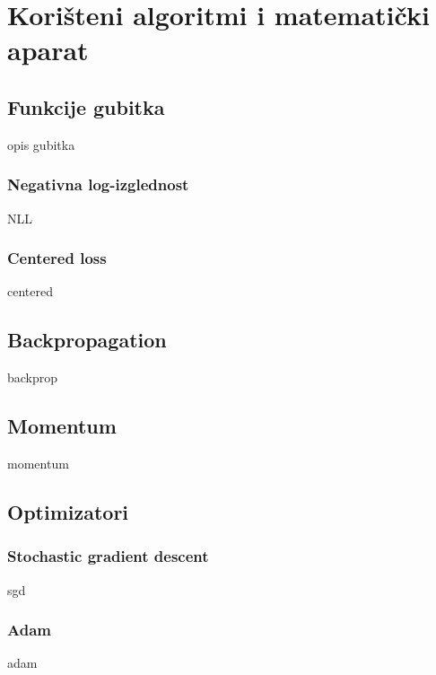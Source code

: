 \chapter{Korišteni algoritmi i matematički aparat}

\section{Funkcije gubitka}

opis gubitka

\subsection{Negativna log-izglednost}

NLL

\subsection{Centered loss}

centered



\section{Backpropagation}

backprop

\section{Momentum}

momentum

\section{Optimizatori}

\subsection{Stochastic gradient descent}

sgd

\subsection{Adam}

adam